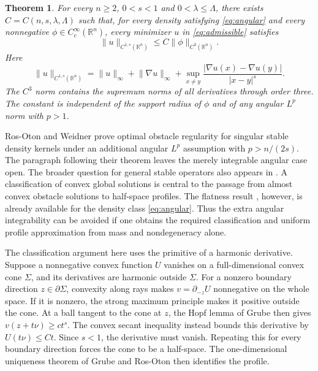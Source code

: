 \documentclass[11pt]{article}
\numberwithin{equation}{section}
\newtheorem{theorem}{Theorem}[section]
\theoremstyle{remark}
\newcommand{\R}{\mathbb R}
\newcommand{\norm}[1]{\lVert #1\rVert}
\newcommand{\abs}[1]{\lvert #1\rvert}
\begin{document}
\begin{theorem}\label{thm:main}
For every $n\ge2$, $0<s<1$ and $0<\lambda\le\Lambda$, there exists $C=C(n,s,\lambda,\Lambda)$ such that, for every density satisfying \eqref{eq:angular} and every nonnegative $\phi\in C_c^\infty(\R^n)$, every minimizer $u$ in \eqref{eq:admissible} satisfies
\begin{equation}\label{eq:main}
 \norm u_{C^{1,s}(\R^n)}\le C\norm\phi_{C^3(\R^n)}.
\end{equation}
Here
\[
 \norm u_{C^{1,s}(\R^n)}
 =\norm u_\infty+\norm{\nabla u}_\infty+
   \sup_{x\ne y}\frac{\abs{\nabla u(x)-\nabla u(y)}}{\abs{x-y}^s}.
\]
The $C^3$ norm contains the supremum norms of all derivatives through order three. The constant is independent of the support radius of $\phi$ and of any angular $L^p$ norm with $p>1$.
\end{theorem}

Ros-Oton and Weidner \cite[Theorem 1.3]{ROW} prove optimal obstacle regularity for singular stable density kernels under an additional angular $L^p$ assumption with $p>n/(2s)$. The paragraph following their theorem leaves the merely integrable angular case open. The broader question for general stable operators also appears in \cite[Section 4.6.2, Open Question 4.3]{FRO}. A classification of convex global solutions is central to the passage from almost convex obstacle solutions to half-space profiles. The flatness result \cite[Proposition 5.8]{ROW}, however, is already available for the density class \eqref{eq:angular}. Thus the extra angular integrability can be avoided if one obtains the required classification and uniform profile approximation from mass and nondegeneracy alone.

The classification argument here uses the primitive of a harmonic derivative. Suppose a nonnegative convex function $U$ vanishes on a full-dimensional convex cone $\Sigma$, and its derivatives are harmonic outside $\Sigma$. For a nonzero boundary direction $z\in\partial\Sigma$, convexity along rays makes $v=\partial_{-z}U$ nonnegative on the whole space. If it is nonzero, the strong maximum principle makes it positive outside the cone. At a ball tangent to the cone at $z$, the Hopf lemma of Grube \cite{GrubeHopf} then gives $v(z+t\nu)\ge ct^s$. The convex secant inequality instead bounds this derivative by $U(t\nu)\le Ct$. Since $s<1$, the derivative must vanish. Repeating this for every boundary direction forces the cone to be a half-space. The one-dimensional uniqueness theorem of Grube and Ros-Oton \cite{GRO} then identifies the profile.
\end{document}
